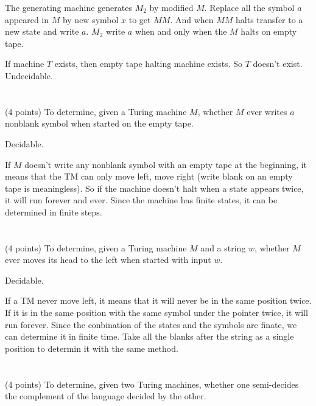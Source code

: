 \documentclass[paper=a4, fontsize=11pt]{scrartcl} %
\begin{document}
The generating machine generates $M_2$ by modified $M$. Replace all
the symbol $a$ appeared in $M$ by new symbol $x$ to get $MM$. And when
$MM$ halts transfer to a new state and write $a$. $M_2$ write $a$ when
and only when the $M$ halts on empty tape.

If machine $T$ exists, then empty tape halting machine exists. So $T$
doesn't exist. Undecidable.


\section{}
\begin{fancyquotes}
  (4 points) To determine, given a Turing machine $M$, whether $M$
  ever writes $a$ nonblank symbol when started on the empty tape.
\end{fancyquotes}

Decidable.

If $M$ doesn't write any nonblank symbol with an empty tape
at the beginning, it means that the TM can only move left, move right
(write blank on an empty tape is meaningless). So if the machine
doesn't halt when a state appears twice, it will run forever and
ever. Since the machine has finite states, it can be determined in
finite steps.


\section{}
\begin{fancyquotes}
  (4 points) To determine, given a Turing machine $M$ and a string
  $w$, whether $M$ ever moves its head to the left when started with
  input $w$.
\end{fancyquotes}

Decidable.

If a TM never move left, it means that it will never be in the same
position twice. If it is in the same position with the same symbol
under the pointer twice, it will run forever. Since the conbination of
the states and the symbols are finate, we can determine it in finite
time. Take all the blanks after the string as a single position to
determin it with the same method.


\section{}
\begin{fancyquotes}
  (4 points) To determine, given two Turing machines, whether one
  semi-decides the complement of the language decided by the other.
\end{fancyquotes}
\end{document}
